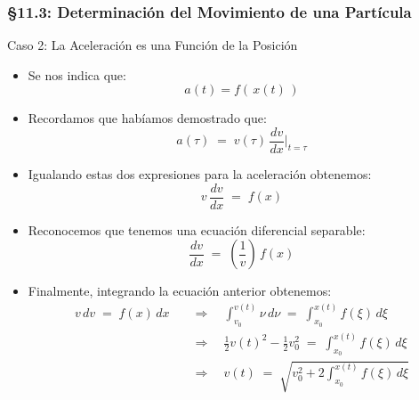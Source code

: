 \documentclass[ 10pt, xcolor = dvipsnames]{beamer}
\begin{document}
\begin{frame}[allowframebreaks]
\frametitle{\S 11.3: Determinaci\'on del Movimiento de una Part\'icula}

Caso 2: La Aceleraci\'on es una Funci\'on de la Posici\'on
\begin{itemize}
\item Se nos indica que: 
\[
a(t) = f( \, x(t) \, )
\]
\item Recordamos que hab\'iamos demostrado que: 
\[
a(\tau) \; = \; v(\tau) \, \frac{dv}{dx}\bigg|_{ t = \tau }
\]
\item Igualando estas dos expresiones para la aceleraci\'on obtenemos: 
\[
v \, \frac{dv}{dx} \; = \; f(x)
\]
\framebreak
\item Reconocemos que tenemos una ecuaci\'on diferencial separable: 
\[
\frac{dv}{dx} \; = \; \left( \frac{1}{v} \right) \, f(x)
\]
\item Finalmente, integrando la ecuaci\'on anterior obtenemos: 
\begin{align*}
v \, dv \; = \; f(x) \, dx \quad 
& \Longrightarrow \quad 
\int_{v_0}^{v(t)} \nu \, d\nu \; = \; 
\int_{x_0}^{x(t)} f( \xi ) \, d\xi \\[2ex]
& \Longrightarrow \quad 
\frac{1}{2} v(t)^2 - \frac{1}{2} v_0^2 \; = \; 
\int_{x_0}^{x(t)} f( \xi ) \, d\xi \\[2ex]
& \Longrightarrow \quad 
v(t) \; = \; 
\sqrt{ v_0^2 + 2 \int_{x_0}^{x(t)} f( \xi ) \, d\xi }
\end{align*}

\end{itemize}

\end{frame}
\end{document}
